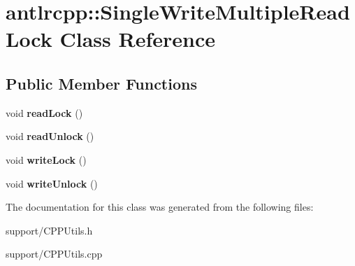 \hypertarget{classantlrcpp_1_1SingleWriteMultipleReadLock}{}\section{antlrcpp\+:\+:Single\+Write\+Multiple\+Read\+Lock Class Reference}
\label{classantlrcpp_1_1SingleWriteMultipleReadLock}
\subsection*{Public Member Functions}
\begin{DoxyCompactItemize}
\item 
\mbox{\label{classantlrcpp_1_1SingleWriteMultipleReadLock_ae6709bfaed62f05615982fceabbea1b2}} 
void {\bfseries read\+Lock} ()
\item 
\mbox{\label{classantlrcpp_1_1SingleWriteMultipleReadLock_a4d9717794f49faa731785384c3c24879}} 
void {\bfseries read\+Unlock} ()
\item 
\mbox{\label{classantlrcpp_1_1SingleWriteMultipleReadLock_a3e1dda5e0e36edf6b80d8a3965851d1b}} 
void {\bfseries write\+Lock} ()
\item 
\mbox{\label{classantlrcpp_1_1SingleWriteMultipleReadLock_adefecf5fd0a7b3843d4044f10e525f8a}} 
void {\bfseries write\+Unlock} ()
\end{DoxyCompactItemize}


The documentation for this class was generated from the following files\+:\begin{DoxyCompactItemize}
\item 
support/C\+P\+P\+Utils.\+h\item 
support/C\+P\+P\+Utils.\+cpp\end{DoxyCompactItemize}
